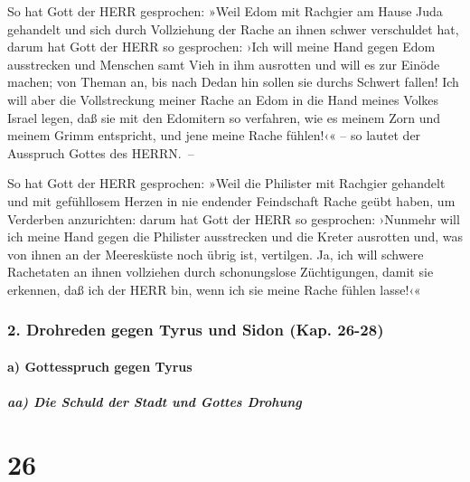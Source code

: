 So hat Gott der HERR gesprochen: »Weil Edom mit Rachgier
am Hause Juda gehandelt und sich durch Vollziehung der Rache an ihnen
schwer verschuldet hat, darum hat Gott der HERR so
gesprochen: ›Ich will meine Hand gegen Edom ausstrecken und Menschen
samt Vieh in ihm ausrotten und will es zur Einöde machen; von Theman an,
bis nach Dedan hin sollen sie durchs Schwert fallen! Ich
will aber die Vollstreckung meiner Rache an Edom in die Hand meines
Volkes Israel legen, daß sie mit den Edomitern so verfahren, wie es
meinem Zorn und meinem Grimm entspricht, und jene meine Rache fühlen!‹«
-- so lautet der Ausspruch Gottes des HERRN.~--

So hat Gott der HERR gesprochen: »Weil die Philister mit
Rachgier gehandelt und mit gefühllosem Herzen in nie endender
Feindschaft Rache geübt haben, um Verderben anzurichten:
darum hat Gott der HERR so gesprochen: ›Nunmehr will ich
meine Hand gegen die Philister ausstrecken und die Kreter ausrotten und,
was von ihnen an der Meeresküste noch übrig ist, vertilgen.
Ja, ich will schwere Rachetaten an ihnen vollziehen durch
schonungslose Züchtigungen, damit sie erkennen, daß ich der HERR bin,
wenn ich sie meine Rache fühlen lasse!‹«

\hypertarget{drohreden-gegen-tyrus-und-sidon-kap.-26-28}{%
\subsubsection{2. Drohreden gegen Tyrus und Sidon (Kap.
26-28)}\label{drohreden-gegen-tyrus-und-sidon-kap.-26-28}}

\hypertarget{a-gottesspruch-gegen-tyrus}{%
\paragraph{a) Gottesspruch gegen
Tyrus}\label{a-gottesspruch-gegen-tyrus}}

\hypertarget{aa-die-schuld-der-stadt-und-gottes-drohung}{%
\subparagraph{aa) Die Schuld der Stadt und Gottes
Drohung}\label{aa-die-schuld-der-stadt-und-gottes-drohung}}

\hypertarget{section-25}{%
\section{26}\label{section-25}}

